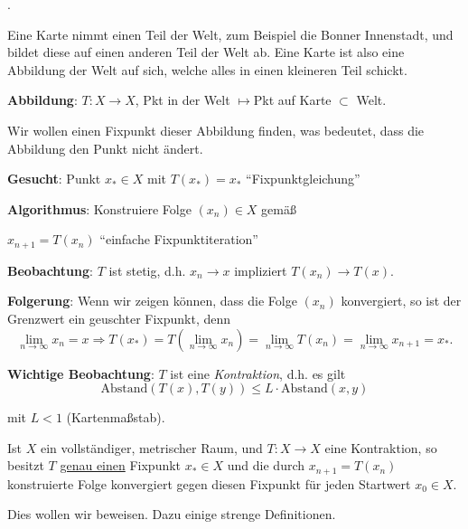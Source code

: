 \documentclass[a4paper,10pt]{article}
\begin{document}
.

Eine Karte nimmt einen Teil der Welt, zum Beispiel die Bonner Innenstadt,
und bildet diese auf einen anderen Teil der Welt ab. Eine Karte ist also eine
Abbildung der Welt auf sich, welche alles in einen kleineren Teil schickt.

\vspace{.5cm}

{\textbf{Abbildung}}:  $T: X \to X$,  
			          Pkt in der Welt $ \mapsto $Pkt auf Karte
			       $\subset $ Welt.

\vspace{.5cm}		       
Wir wollen einen Fixpunkt dieser Abbildung finden, was bedeutet, dass die Abbildung 
den Punkt nicht ändert.

\vspace{.5cm}		       
 {\textbf{Gesucht}}: Punkt  $x_* \in X$  mit
 $\boxed{T(x_*) = x_*}$ ``Fixpunktgleichung''
\vspace{.5cm}		       
 

 {\textbf{Algorithmus}}: Konstruiere Folge  $(x_n) \in X$  gemäß 
  
    \hspace{2cm} $\boxed{x_{n+1} = T(x_n)}$ ``einfache Fixpunktiteration''
\vspace{.5cm}		       


{\textbf{Beobachtung}}: $T$ ist stetig, d.h. $x_n \to x$ impliziert $T(x_n) \to T(x)$.

\vspace{.5cm}		       

{\textbf{Folgerung}}: Wenn wir zeigen können, dass die Folge $(x_n)$ konvergiert,
so ist der Grenzwert ein geuschter Fixpunkt, denn
\[
 \lim_{n \to \infty} x_n = x \Rightarrow T(x_*) = T(\lim_{n \to \infty} x_n) =
 \lim_{n \to \infty} T(x_n) = \lim_{n \to \infty} x_{n+1} = x_*.
\]


\textbf{Wichtige Beobachtung}: $T$ ist eine \textit{Kontraktion}, d.h. es gilt
\[
 \text{Abstand}(T(x), T(y)) \leq L \cdot \text{Abstand}(x, y)
\]

mit $L < 1$ (Kartenmaßstab).


\begin{thrm*}

Ist $X$ ein vollständiger, metrischer Raum, und $T: X\to X$ eine Kontraktion, so besitzt $T$
\underline{genau einen} Fixpunkt $x_* \in X$ und die durch $x_{n+1} = T(x_n)$ konstruierte Folge
konvergiert gegen diesen Fixpunkt für jeden Startwert $x_0 \in X$.
\end{thrm*}
Dies wollen wir beweisen. Dazu einige strenge Definitionen.
\end{document}
